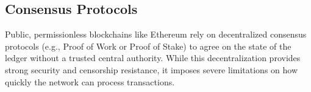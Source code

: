 \subsection{Consensus Protocols}
Public, permissionless blockchains like Ethereum rely on decentralized consensus protocols (e.g., Proof of Work or Proof of Stake) to agree on the state of the ledger without a trusted central authority. While this decentralization provides strong security and censorship resistance, it imposes severe limitations on how quickly the network can process transactions.